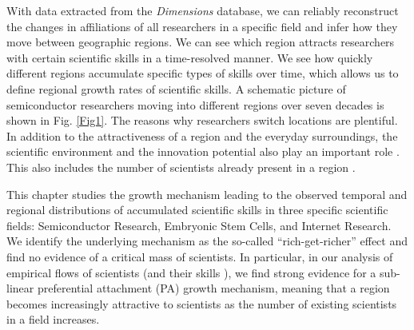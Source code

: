 \documentclass[draft,final]{vutinfth} %
\begin{document}
With data extracted from the {\em Dimensions} database, we can reliably reconstruct the changes in affiliations of all researchers in a specific field and infer how they move between geographic regions. We can see which region attracts researchers with certain scientific skills in a time-resolved manner. We see how quickly different regions accumulate specific types of skills over time, which allows us to define regional growth rates of scientific skills. A schematic picture of semiconductor researchers moving into different regions over seven decades is shown in Fig. \ref{Fig1}. The reasons why researchers switch locations are plentiful. In addition to the attractiveness of a region and the everyday surroundings, the scientific environment and the innovation potential also play an important role \cite{trippl2009islands,menter2018search}. This also includes the number of scientists already present in a region \cite{zucker2009star}.

This chapter studies the growth mechanism leading to the observed temporal and regional distributions of accumulated scientific skills in three specific scientific fields: Semiconductor Research, Embryonic Stem Cells, and Internet Research. We identify the underlying mechanism as the so-called ``rich-get-richer'' effect and find no evidence of a critical mass of scientists. In particular, in our analysis of empirical flows of scientists (and their skills ), we find strong evidence for a sub-linear preferential attachment (PA) growth mechanism, meaning that a region becomes increasingly attractive to scientists as the number of existing scientists in a field increases.
\end{document}
